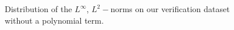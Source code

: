 \documentclass[12pt]{report} %
\begin{document}
\begin{figure}
\begin{tabular}{cccccc}
  \end{tabular}
  \caption{Distribution of the $L^\infty$, $L^2-$norms on our verification dataset
    without a polynomial term.}
  \label{fig:u2-results-overall-poly-1}
\end{figure}
\end{document}
